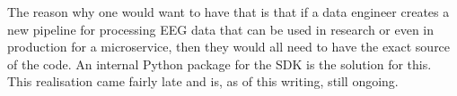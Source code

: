 The reason why one would want to have that is that if a data engineer creates a new pipeline for processing EEG data that can be used in research or even in production for a microservice, then they would all need to have the exact source of the code. An internal Python package for the SDK is the solution for this. This realisation came fairly late and is, as of this writing, still ongoing.
